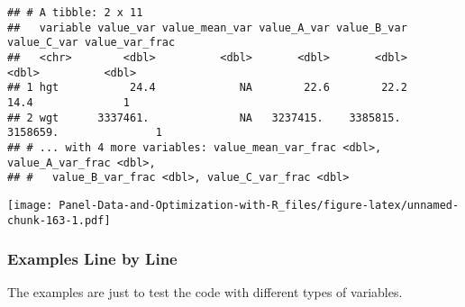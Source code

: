 \documentclass[
]{book}
\newenvironment{Shaded}{\begin{snugshade}}{\end{snugshade}}
\newcommand{\DataTypeTok}[1]{\textcolor[rgb]{0.13,0.29,0.53}{#1}}
\newcommand{\DecValTok}[1]{\textcolor[rgb]{0.00,0.00,0.81}{#1}}
\newcommand{\KeywordTok}[1]{\textcolor[rgb]{0.13,0.29,0.53}{\textbf{#1}}}
\newcommand{\NormalTok}[1]{#1}
\newcommand{\OperatorTok}[1]{\textcolor[rgb]{0.81,0.36,0.00}{\textbf{#1}}}
\newcommand{\StringTok}[1]{\textcolor[rgb]{0.31,0.60,0.02}{#1}}
\begin{document}
\begin{Shaded}
\end{Shaded}

\begin{verbatim}
## # A tibble: 2 x 11
##   variable value_var value_mean_var value_A_var value_B_var value_C_var value_var_frac
##   <chr>        <dbl>          <dbl>       <dbl>       <dbl>       <dbl>          <dbl>
## 1 hgt           24.4             NA        22.6        22.2        14.4              1
## 2 wgt      3337461.              NA   3237415.    3385815.    3158659.               1
## # ... with 4 more variables: value_mean_var_frac <dbl>, value_A_var_frac <dbl>,
## #   value_B_var_frac <dbl>, value_C_var_frac <dbl>
\end{verbatim}

\begin{Shaded}
\end{Shaded}

\texttt{[image: Panel-Data-and-Optimization-with-R\_files/figure-latex/unnamed-chunk-163-1.pdf]}

\hypertarget{examples-line-by-line-1}{%
\subsubsection{Examples Line by Line}\label{examples-line-by-line-1}}

The examples are just to test the code with different types of variables.

\begin{Shaded}
\end{Shaded}
\end{document}

